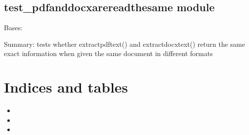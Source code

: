 \documentclass[letterpaper,10pt,english]{sphinxmanual}
\begin{document}
\section{test\_pdfanddocxarereadthesame module}
\label{\detokenize{unit_tests:test-pdfanddocxarereadthesame-module}}\label{\detokenize{unit_tests:module-unit_tests.test_pdfanddocxarereadthesame}}

\begin{fulllineitems}
\label{\detokenize{unit_tests:unit_tests.test_pdfanddocxarereadthesame.TestEnsurepdfanddocxarereadthesame}}
Bases: 

\begin{fulllineitems}
\label{\detokenize{unit_tests:unit_tests.test_pdfanddocxarereadthesame.TestEnsurepdfanddocxarereadthesame.test_ensurepdfanddocarereadthesame}}
Summary: tests whether extractpdftext() and extractdocxtext() return the same exact information when given the same document in different formats

\end{fulllineitems}


\end{fulllineitems}



\chapter{Indices and tables}
\label{\detokenize{index:indices-and-tables}}\begin{itemize}
\item {} 

\item {} 

\item {} 

\end{itemize}
\end{document}
